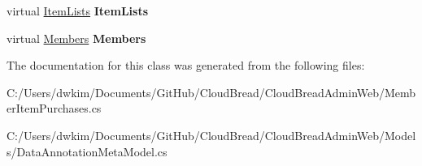 \begin{DoxyCompactItemize}
\item 
virtual \hyperlink{class_cloud_bread_admin_web_1_1_item_lists}{Item\+Lists} {\bfseries Item\+Lists}\hypertarget{class_cloud_bread_admin_web_1_1_member_item_purchases_ab41b6e0a7143244983fa31859e286599}{}\label{class_cloud_bread_admin_web_1_1_member_item_purchases_ab41b6e0a7143244983fa31859e286599}

\item 
virtual \hyperlink{class_cloud_bread_admin_web_1_1_members}{Members} {\bfseries Members}\hypertarget{class_cloud_bread_admin_web_1_1_member_item_purchases_a5065e8de3829f0a180dffc344635fb8f}{}\label{class_cloud_bread_admin_web_1_1_member_item_purchases_a5065e8de3829f0a180dffc344635fb8f}

\end{DoxyCompactItemize}


The documentation for this class was generated from the following files\+:\begin{DoxyCompactItemize}
\item 
C\+:/\+Users/dwkim/\+Documents/\+Git\+Hub/\+Cloud\+Bread/\+Cloud\+Bread\+Admin\+Web/Member\+Item\+Purchases.\+cs\item 
C\+:/\+Users/dwkim/\+Documents/\+Git\+Hub/\+Cloud\+Bread/\+Cloud\+Bread\+Admin\+Web/\+Models/Data\+Annotation\+Meta\+Model.\+cs\end{DoxyCompactItemize}

